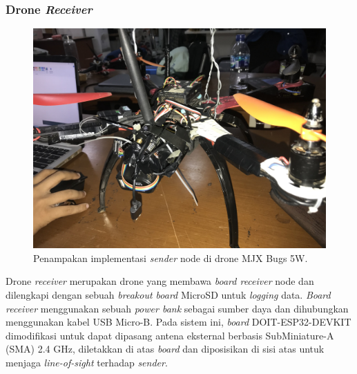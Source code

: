 \subsubsection{Drone \textit{Receiver}}
\begin{figure}[H]
	\centering
	\includegraphics[scale=0.075]{./assets/Pengujian/DroneReceiver}
	\caption{Penampakan implementasi \textit{sender} node di drone MJX Bugs 5W.}
\end{figure}
Drone \textit{receiver} merupakan drone yang membawa \textit{board receiver} node dan dilengkapi dengan sebuah \textit{breakout board} MicroSD untuk \textit{logging} data. \textit{Board receiver} menggunakan sebuah \textit{power bank} sebagai sumber daya dan dihubungkan menggunakan kabel USB Micro-B. Pada sistem ini, \textit{board} DOIT-ESP32-DEVKIT dimodifikasi untuk dapat dipasang antena eksternal berbasis SubMiniature-A (SMA) 2.4 GHz, diletakkan di atas \textit{board} dan diposisikan di sisi atas untuk menjaga \textit{line-of-sight} terhadap \textit{sender}.

